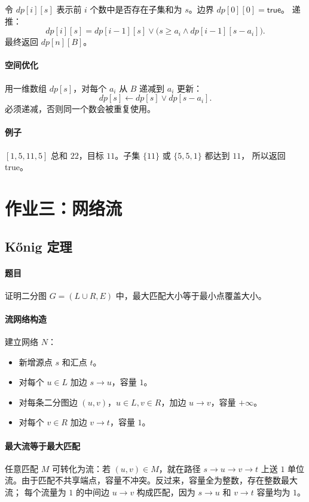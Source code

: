 \documentclass[UTF8,openany,12pt]{ctexbook}
\theoremstyle{remark}
\begin{document}
令 $dp[i][s]$ 表示前 $i$ 个数中是否存在子集和为 $s$。边界 $dp[0][0]=\mathsf{true}$。
递推：
\[
  dp[i][s]=dp[i-1][s]\vee\bigl(s\ge a_i\wedge dp[i-1][s-a_i]\bigr).
\]
最终返回 $dp[n][B]$。

\paragraph{空间优化}
用一维数组 $dp[s]$，对每个 $a_i$ 从 $B$ 递减到 $a_i$ 更新：
\[
  dp[s]\gets dp[s]\vee dp[s-a_i].
\]
必须递减，否则同一个数会被重复使用。

\paragraph{例子}
$[1,5,11,5]$ 总和 $22$，目标 $11$。子集 $\{11\}$ 或 $\{5,5,1\}$ 都达到 $11$，
所以返回 true。

\section{作业三：网络流}

\subsection{Kőnig 定理}

\paragraph{题目}
证明二分图 $G=(L\cup R,E)$ 中，最大匹配大小等于最小点覆盖大小。

\paragraph{流网络构造}
建立网络 $N$：
\begin{itemize}
  \item 新增源点 $s$ 和汇点 $t$。
  \item 对每个 $u\in L$ 加边 $s\to u$，容量 $1$。
  \item 对每条二分图边 $(u,v)$，$u\in L,v\in R$，加边 $u\to v$，容量 $+\infty$。
  \item 对每个 $v\in R$ 加边 $v\to t$，容量 $1$。
\end{itemize}

\paragraph{最大流等于最大匹配}
任意匹配 $M$ 可转化为流：若 $(u,v)\in M$，就在路径 $s\to u\to v\to t$
上送 $1$ 单位流。由于匹配不共享端点，容量不冲突。反过来，容量全为整数，存在整数最大流；
每个流量为 $1$ 的中间边 $u\to v$ 构成匹配，因为 $s\to u$ 和 $v\to t$ 容量均为 $1$。
\end{document}
